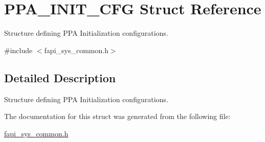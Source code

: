 \hypertarget{structPPA__INIT__CFG}{\section{P\-P\-A\-\_\-\-I\-N\-I\-T\-\_\-\-C\-F\-G Struct Reference}
\label{structPPA__INIT__CFG}
}


Structure defining P\-P\-A Initialization configurations.  




{\ttfamily \#include $<$fapi\-\_\-sys\-\_\-common.\-h$>$}



\subsection{Detailed Description}
Structure defining P\-P\-A Initialization configurations. 

The documentation for this struct was generated from the following file\-:\begin{DoxyCompactItemize}
\item 
\hyperlink{fapi__sys__common_8h}{fapi\-\_\-sys\-\_\-common.\-h}\end{DoxyCompactItemize}
